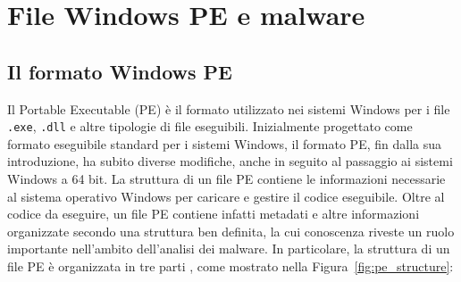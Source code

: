\chapter{File Windows PE e malware}

\section{Il formato Windows PE}

Il Portable Executable (PE) è il formato utilizzato nei sistemi Windows
per i file \texttt{.exe}, \texttt{.dll} e altre tipologie di file
eseguibili. Inizialmente progettato come formato eseguibile standard
per i sistemi Windows, il formato PE, fin dalla sua introduzione, ha
subito diverse modifiche, anche in seguito al passaggio ai sistemi
Windows a 64 bit.
La struttura di un file PE contiene le informazioni necessarie al
sistema operativo Windows per caricare e gestire il codice eseguibile.
Oltre al codice da eseguire, un file PE contiene infatti metadati e
altre informazioni organizzate secondo una struttura ben definita,
la cui conoscenza riveste un ruolo importante nell'ambito dell'analisi
dei malware.
In particolare, la struttura di un file PE è organizzata in tre parti
\cite{microsoftPE}, come mostrato nella
Figura~\ref{fig:pe_structure}:

